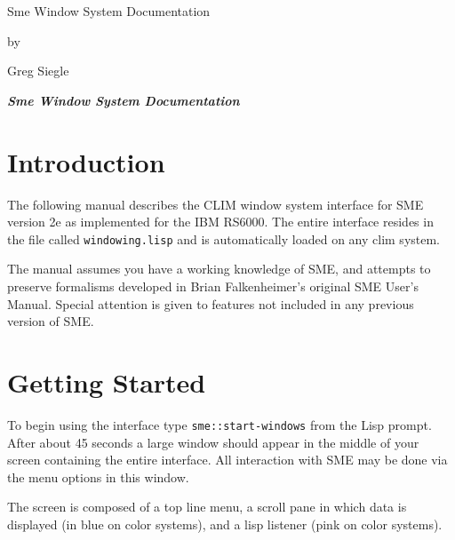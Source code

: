 \raggedright
\renewcommand{\baselinestretch}{1.0}
\renewcommand{\textfraction}{0.2}
\setlength{\parindent}{0.5in}
\setlength{\textwidth}{6in}
\setlength{\textheight}{8.5in}
\setlength{\headheight}{0.2in}
\setlength{\topmargin}{-.5in}
\newcommand{\cpic}[1]{\begin{figure}[htb]
        \centerline{\psfig{figure=#1}}
        \end{figure}}


\vspace{2in}
\begin{center} 
{\Large Sme Window System Documentation}

\vspace {0.2in}
by

Greg Siegle


\vspace{2in}
\pagebreak

\begin{center}
{\em {\bf Sme Window System Documentation}}     
\end{center}

\vspace{0.2in}

\section{Introduction}

The following manual describes the CLIM window system interface for
SME version 2e as implemented for the IBM RS6000. The entire interface
resides in the file called {\tt windowing.lisp} and is automatically
loaded on any clim system.

The manual assumes you have a working knowledge of SME, and attempts
to preserve formalisms developed in Brian Falkenheimer's original SME
User's Manual. Special attention is given to features not included in
any previous version of SME.

\section{Getting Started} 

To begin using the interface type {\tt sme::start-windows} from the
Lisp prompt. After about 45 seconds a large window should appear in
the middle of your screen containing the entire interface. All
interaction with SME may be done via the menu options in this window.

The screen is composed of a top line menu, a scroll pane in which data
is displayed (in blue on color systems), and a lisp listener (pink on
color systems).


\end{center}
